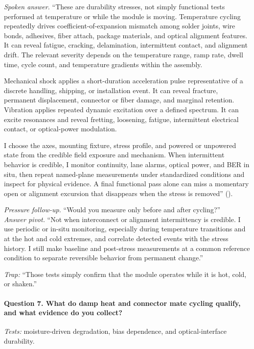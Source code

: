 \textit{Spoken answer.}
``These are durability stresses, not simply functional tests performed at
temperature or while the module is moving. Temperature cycling repeatedly
drives coefficient-of-expansion mismatch among solder joints, wire bonds,
adhesives, fiber attach, package materials, and optical alignment features. It
can reveal fatigue, cracking, delamination, intermittent contact, and
alignment drift. The relevant severity depends on the temperature range, ramp
rate, dwell time, cycle count, and temperature gradients within the assembly.

Mechanical shock applies a short-duration acceleration pulse representative of
a discrete handling, shipping, or installation event. It can reveal fracture,
permanent displacement, connector or fiber damage, and marginal retention.
Vibration applies repeated dynamic excitation over a defined spectrum. It can
excite resonances and reveal fretting, loosening, fatigue, intermittent
electrical contact, or optical-power modulation.

I choose the axes, mounting fixture, stress profile, and powered or unpowered
state from the credible field exposure and mechanism. When intermittent
behavior is credible, I monitor continuity, lane alarms, optical power, and BER
in situ, then repeat named-plane measurements under standardized conditions and
inspect for physical evidence. A final functional pass alone can miss a
momentary open or alignment excursion that disappears when the stress is
removed''
().

\textit{Pressure follow-up.} ``Would you measure only before and after
cycling?''\\
\textit{Answer pivot.} ``Not when interconnect or alignment intermittency is
credible. I use periodic or in-situ monitoring, especially during temperature
transitions and at the hot and cold extremes, and correlate detected events
with the stress history. I still make baseline and post-stress measurements at
a common reference condition to separate reversible behavior from permanent
change.''

\textit{Trap:} ``Those tests simply confirm that the module operates while it
is hot, cold, or shaken.''

\paragraph{Question 7. What do damp heat and connector mate cycling qualify,
and what evidence do you collect?}
\textit{Tests:} moisture-driven degradation, bias dependence, and
optical-interface durability.

